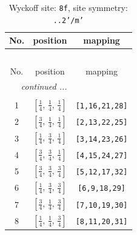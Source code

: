 \documentclass[fleqn,8pt]{jsarticle}
\begin{document}
\begin{longtable}{ccc}
\caption{Wyckoff site: {\tt 8f}, site symmetry: {\tt ..2'/m'}}
 \\
 \hline \hline
No. & position & mapping \\ \hline \endfirsthead

\multicolumn{2}{l}{\tablename\ \thetable{}} \\
 \hline \hline
No. & position & mapping \\ \hline \endhead

 \hline \hline
\multicolumn{2}{r}{\footnotesize\it continued ...} \\ \endfoot

 \hline \hline
\multicolumn{2}{r}{} \\ \endlastfoot

1 & $\left[ \frac{1}{4},\, \frac{1}{4},\, \frac{1}{4} \right]$ & {\tt [1,16,21,28]} \\ \hline
2 & $\left[ \frac{3}{4},\, \frac{1}{4},\, \frac{1}{4} \right]$ & {\tt [2,13,22,25]} \\ \hline
3 & $\left[ \frac{1}{4},\, \frac{3}{4},\, \frac{1}{4} \right]$ & {\tt [3,14,23,26]} \\ \hline
4 & $\left[ \frac{3}{4},\, \frac{3}{4},\, \frac{1}{4} \right]$ & {\tt [4,15,24,27]} \\ \hline
5 & $\left[ \frac{3}{4},\, \frac{3}{4},\, \frac{3}{4} \right]$ & {\tt [5,12,17,32]} \\ \hline
6 & $\left[ \frac{1}{4},\, \frac{3}{4},\, \frac{3}{4} \right]$ & {\tt [6,9,18,29]} \\ \hline
7 & $\left[ \frac{3}{4},\, \frac{1}{4},\, \frac{3}{4} \right]$ & {\tt [7,10,19,30]} \\ \hline
8 & $\left[ \frac{1}{4},\, \frac{1}{4},\, \frac{3}{4} \right]$ & {\tt [8,11,20,31]} \\
\end{longtable}
\renewcommand{\arraystretch}{1.2}
\end{document}
